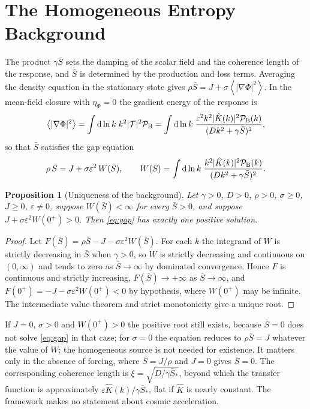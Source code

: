 \documentclass[11pt]{article}
\newtheorem{proposition}{Proposition}[section]
\theoremstyle{definition}
\theoremstyle{remark}
\newcommand{\dd}{\mathrm{d}}
\newcommand{\TT}{\mathcal{T}}
\newcommand{\Sb}{\bar{S}}
\newcommand{\avg}[1]{\left\langle #1 \right\rangle}
\newcommand{\Pk}{\mathcal{P}}
\begin{document}
\section{The Homogeneous Entropy Background}\label{sec:background}

The product $\gamma\Sb$ sets the damping of the scalar field and the coherence length of the response, and $\Sb$ is determined by the production and loss terms. Averaging the density equation in the stationary state gives $\rho\Sb=J+\sigma\avg{|\nabla\Phi|^2}$. In the mean-field closure with $\eta_\Phi=0$ the gradient energy of the response is
\begin{equation}
\avg{|\nabla\Phi|^2}=\int\dd\ln k\;k^2|\TT|^2\Pk_{\rm B}=\int\dd\ln k\;\frac{\varepsilon^2k^2|\hat K(k)|^2\Pk_{\rm B}(k)}{(Dk^2+\gamma\Sb)^2},
\end{equation}
so that $\Sb$ satisfies the gap equation
\begin{equation}
\rho\,\Sb=J+\sigma\varepsilon^2\,W(\Sb),\qquad W(\Sb)=\int\dd\ln k\;\frac{k^2|\hat K(k)|^2\Pk_{\rm B}(k)}{(Dk^2+\gamma\Sb)^2}.
\label{eq:gap}
\end{equation}

\begin{proposition}[Uniqueness of the background]\label{prop:gap}
Let $\gamma>0$, $D>0$, $\rho>0$, $\sigma\ge0$, $J\ge0$, $\varepsilon\ne0$, suppose $W(\Sb)<\infty$ for every $\Sb>0$, and suppose $J+\sigma\varepsilon^2W(0^+)>0$. Then \eqref{eq:gap} has exactly one positive solution.
\end{proposition}

\begin{proof}
Let $F(\Sb)=\rho\Sb-J-\sigma\varepsilon^2W(\Sb)$. For each $k$ the integrand of $W$ is strictly decreasing in $\Sb$ when $\gamma>0$, so $W$ is strictly decreasing and continuous on $(0,\infty)$ and tends to zero as $\Sb\to\infty$ by dominated convergence. Hence $F$ is continuous and strictly increasing, $F(\Sb)\to+\infty$ as $\Sb\to\infty$, and $F(0^+)=-J-\sigma\varepsilon^2W(0^+)<0$ by hypothesis, where $W(0^+)$ may be infinite. The intermediate value theorem and strict monotonicity give a unique root.
\end{proof}

If $J=0$, $\sigma>0$ and $W(0^+)>0$ the positive root still exists, because $\Sb=0$ does not solve \eqref{eq:gap} in that case; for $\sigma=0$ the equation reduces to $\rho\Sb=J$ whatever the value of $W$; the homogeneous source is not needed for existence. It matters only in the absence of forcing, where $\Sb=J/\rho$ and $J=0$ gives $\Sb=0$. The corresponding coherence length is $\xi=\sqrt{D/\gamma\Sb_*}$, beyond which the transfer function is approximately $\varepsilon\hat K(k)/\gamma\Sb_*$, flat if $\hat K$ is nearly constant. The framework makes no statement about cosmic acceleration.
\end{document}

